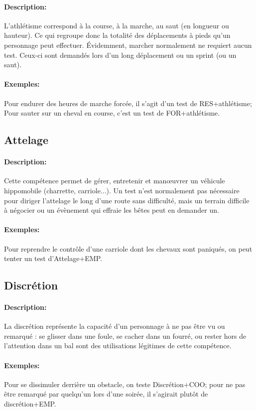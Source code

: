 \documentclass[10pt,a4paper,twocolumn]{book}
\begin{document}
\paragraph{Description:}L'athlétisme correspond à la course, à la marche, au saut (en longueur ou hauteur). Ce qui regroupe donc la totalité des déplacements à pieds qu'un personnage peut effectuer. Évidemment, marcher normalement ne requiert aucun test. Ceux-ci sont demandés lors d'un long déplacement ou un sprint (ou un saut).
\paragraph{Exemples:}Pour endurer des heures de marche forcée, il s'agit d'un test de RES+athlétisme; Pour sauter sur un cheval en course, c'est un test de FOR+athlétisme.
\subsection{Attelage}
\paragraph{Description:}Cette compétence permet de gérer, entretenir et manœuvrer un véhicule hippomobile (charrette, carriole...). Un test n'est normalement pas nécessaire pour diriger l'attelage le long d'une route sans difficulté, mais un terrain difficile à négocier ou un évènement qui effraie les bêtes peut en demander un.
\paragraph{Exemples:}Pour reprendre le contrôle d'une carriole dont les chevaux sont paniqués, on peut tenter un test d'Attelage+EMP.
\subsection{Discrétion}
\paragraph{Description:}La discrétion représente la capacité d'un personnage à ne pas être vu ou remarqué : se glisser dans une foule, se cacher dans un fourré, ou rester hors de l'attention dans un bal sont des utilisations légitimes de cette compétence.
\paragraph{Exemples:}Pour se dissimuler derrière un obstacle, on teste Discrétion+COO; pour ne pas être remarqué par quelqu'un lors d'une soirée, il s'agirait plutôt de discrétion+EMP.
\end{document}

